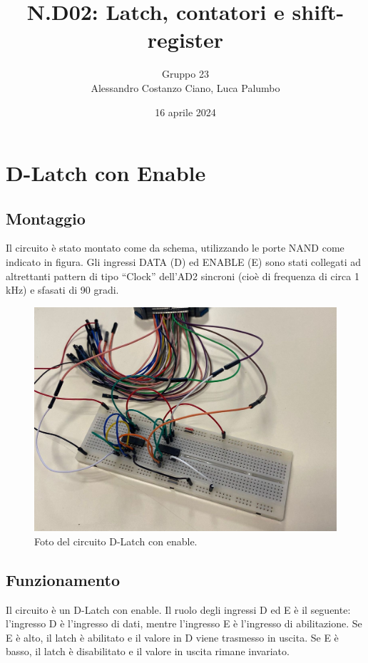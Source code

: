 \documentclass[10pt,a4paper]{article}
\author{Gruppo 23 \\ Alessandro Costanzo Ciano, Luca Palumbo}
\title{N.D02: Latch, contatori e shift-register}
\begin{document}
\date{16 aprile 2024}
\maketitle

\section{D-Latch con Enable}
\subsection{Montaggio}
Il circuito è stato montato come da schema, utilizzando le porte NAND come indicato in figura. Gli ingressi DATA (D) ed ENABLE (E) sono stati collegati ad altrettanti pattern di tipo “Clock” dell’AD2 sincroni (cioè di frequenza di circa 1 kHz) e sfasati di 90 gradi.

\begin{figure}[htp]
\begin{center}
\includegraphics[scale=0.25]{circuito1.jpeg}
\caption{Foto del circuito D-Latch con enable.}
\end{center}
\end{figure}

\subsection{Funzionamento}
Il circuito è un D-Latch con enable. Il ruolo degli ingressi D ed E è il seguente: l'ingresso D è l'ingresso di dati, mentre l'ingresso E è l'ingresso di abilitazione. Se E è alto, il latch è abilitato e il valore in D viene trasmesso in uscita. Se E è basso, il latch è disabilitato e il valore in uscita rimane invariato. 
\end{document}
